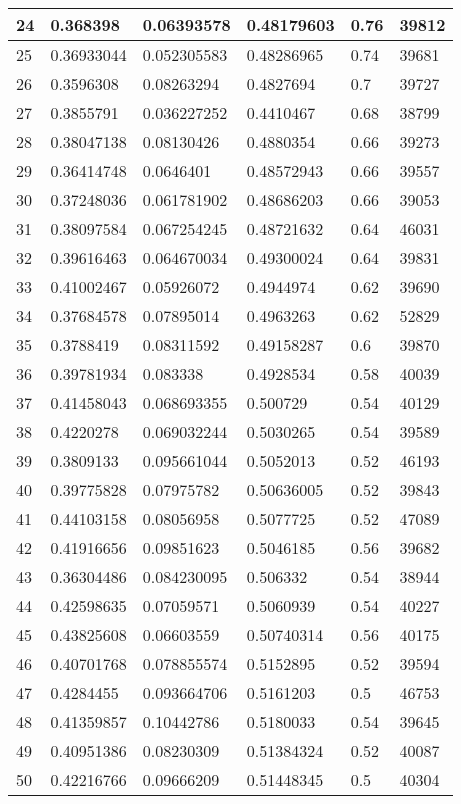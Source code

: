 \begin{longtable}{|l|l|l|l|l|l|}
24 & 0.368398 & 0.06393578 & 0.48179603 & 0.76 & 39812 \\ \hline 
25 & 0.36933044 & 0.052305583 & 0.48286965 & 0.74 & 39681 \\ \hline 
26 & 0.3596308 & 0.08263294 & 0.4827694 & 0.7 & 39727 \\ \hline 
27 & 0.3855791 & 0.036227252 & 0.4410467 & 0.68 & 38799 \\ \hline 
28 & 0.38047138 & 0.08130426 & 0.4880354 & 0.66 & 39273 \\ \hline 
29 & 0.36414748 & 0.0646401 & 0.48572943 & 0.66 & 39557 \\ \hline 
30 & 0.37248036 & 0.061781902 & 0.48686203 & 0.66 & 39053 \\ \hline 
31 & 0.38097584 & 0.067254245 & 0.48721632 & 0.64 & 46031 \\ \hline 
32 & 0.39616463 & 0.064670034 & 0.49300024 & 0.64 & 39831 \\ \hline 
33 & 0.41002467 & 0.05926072 & 0.4944974 & 0.62 & 39690 \\ \hline 
34 & 0.37684578 & 0.07895014 & 0.4963263 & 0.62 & 52829 \\ \hline 
35 & 0.3788419 & 0.08311592 & 0.49158287 & 0.6 & 39870 \\ \hline 
36 & 0.39781934 & 0.083338 & 0.4928534 & 0.58 & 40039 \\ \hline 
37 & 0.41458043 & 0.068693355 & 0.500729 & 0.54 & 40129 \\ \hline 
38 & 0.4220278 & 0.069032244 & 0.5030265 & 0.54 & 39589 \\ \hline 
39 & 0.3809133 & 0.095661044 & 0.5052013 & 0.52 & 46193 \\ \hline 
40 & 0.39775828 & 0.07975782 & 0.50636005 & 0.52 & 39843 \\ \hline 
41 & 0.44103158 & 0.08056958 & 0.5077725 & 0.52 & 47089 \\ \hline 
42 & 0.41916656 & 0.09851623 & 0.5046185 & 0.56 & 39682 \\ \hline 
43 & 0.36304486 & 0.084230095 & 0.506332 & 0.54 & 38944 \\ \hline 
44 & 0.42598635 & 0.07059571 & 0.5060939 & 0.54 & 40227 \\ \hline 
45 & 0.43825608 & 0.06603559 & 0.50740314 & 0.56 & 40175 \\ \hline 
46 & 0.40701768 & 0.078855574 & 0.5152895 & 0.52 & 39594 \\ \hline 
47 & 0.4284455 & 0.093664706 & 0.5161203 & 0.5 & 46753 \\ \hline 
48 & 0.41359857 & 0.10442786 & 0.5180033 & 0.54 & 39645 \\ \hline 
49 & 0.40951386 & 0.08230309 & 0.51384324 & 0.52 & 40087 \\ \hline 
50 & 0.42216766 & 0.09666209 & 0.51448345 & 0.5 & 40304 \\ \hline 
\end{longtable}